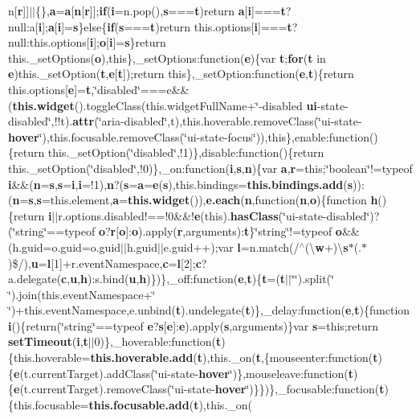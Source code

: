 {n}\mbox{[}{\bf r}\mbox{]}\mbox{]}$\vert$$\vert$\{\},{\bf a}={\bf a}\mbox{[}{\bf n}\mbox{[}{\bf r}\mbox{]}\mbox{]};{\bf if}({\bf i}=n.\-pop(),{\bf s}==={\bf t})return {\bf a}\mbox{[}{\bf i}\mbox{]}==={\bf t}?null\-:a\mbox{[}{\bf i}\mbox{]};{\bf a}\mbox{[}{\bf i}\mbox{]}={\bf s}\}else\{{\bf if}({\bf s}==={\bf t})return this.\-options\mbox{[}{\bf i}\mbox{]}==={\bf t}?null\-:this.\-options\mbox{[}{\bf i}\mbox{]};{\bf o}\mbox{[}{\bf i}\mbox{]}={\bf s}\}return this.\-\_\-set\-Options({\bf o}),this\},\-\_\-set\-Options\-:function({\bf e})\{var {\bf t};{\bf for}({\bf t} in {\bf e})this.\-\_\-set\-Option({\bf t},{\bf e}\mbox{[}{\bf t}\mbox{]});return this\},\-\_\-set\-Option\-:function({\bf e},{\bf t})\{return this.\-options\mbox{[}{\bf e}\mbox{]}={\bf t},\char`\"{}disabled\char`\"{}===e\&\&({\bf this.\-widget}().toggle\-Class(this.\-widget\-Full\-Name+\char`\"{}-\/disabled {\bf ui}-\/state-\/disabled\char`\"{},!!t).{\bf attr}(\char`\"{}aria-\/disabled\char`\"{},t),this.\-hoverable.\-remove\-Class(\char`\"{}ui-\/state-\/{\bf hover}\char`\"{}),this.\-focusable.\-remove\-Class(\char`\"{}ui-\/state-\/focus\char`\"{})),this\},enable\-:function()\{return this.\-\_\-set\-Option(\char`\"{}disabled\char`\"{},!1)\},disable\-:function()\{return this.\-\_\-set\-Option(\char`\"{}disabled\char`\"{},!0)\},\-\_\-on\-:function({\bf i},{\bf s},{\bf n})\{var {\bf a},{\bf r}=this;\char`\"{}boolean\char`\"{}!=typeof {\bf i}\&\&({\bf n}={\bf s},{\bf s}={\bf i},{\bf i}=!1),{\bf n}?({\bf s}={\bf a}={\bf e}({\bf s}),this.\-bindings={\bf this.\-bindings.\-add}({\bf s}))\-:({\bf n}={\bf s},{\bf s}=this.\-element,{\bf a}={\bf this.\-widget}()),{\bf e.\-each}({\bf n},function({\bf n},{\bf o})\{function {\bf h}()\{return {\bf i}$\vert$$\vert$r.\-options.\-disabled!==!0\&\&!{\bf e}(this).{\bf has\-Class}(\char`\"{}ui-\/state-\/disabled\char`\"{})?(\char`\"{}string\char`\"{}==typeof {\bf o}?{\bf r}\mbox{[}{\bf o}\mbox{]}\-:{\bf o}).apply({\bf r},arguments)\-:{\bf t}\}\char`\"{}string\char`\"{}!=typeof {\bf o}\&\&(h.\-guid=o.\-guid=o.\-guid$\vert$$\vert$h.\-guid$\vert$$\vert$e.\-guid++);var {\bf l}=n.\-match(/$^\wedge$(\textbackslash{}{\bf w}+)\textbackslash{}{\bf s}$\ast$(.$\ast$)\$/),{\bf u}={\bf l}\mbox{[}1\mbox{]}+r.\-event\-Namespace,{\bf c}={\bf l}\mbox{[}2\mbox{]};{\bf c}?a.\-delegate({\bf c},{\bf u},{\bf h})\-:s.\-bind({\bf u},{\bf h})\})\},\-\_\-off\-:function({\bf e},{\bf t})\{{\bf t}=({\bf t}$\vert$$\vert$\char`\"{}\char`\"{}).split(\char`\"{} \char`\"{}).join(this.\-event\-Namespace+\char`\"{} \char`\"{})+this.\-event\-Namespace,e.\-unbind({\bf t}).undelegate({\bf t})\},\-\_\-delay\-:function({\bf e},{\bf t})\{function {\bf i}()\{return(\char`\"{}string\char`\"{}==typeof {\bf e}?{\bf s}\mbox{[}{\bf e}\mbox{]}\-:{\bf e}).apply({\bf s},arguments)\}var {\bf s}=this;return {\bf set\-Timeout}({\bf i},{\bf t}$\vert$$\vert$0)\},\-\_\-hoverable\-:function({\bf t})\{this.\-hoverable={\bf this.\-hoverable.\-add}({\bf t}),this.\-\_\-on({\bf t},\{mouseenter\-:function({\bf t})\{{\bf e}(t.\-current\-Target).add\-Class(\char`\"{}ui-\/state-\/{\bf hover}\char`\"{})\},mouseleave\-:function({\bf t})\{{\bf e}(t.\-current\-Target).remove\-Class(\char`\"{}ui-\/state-\/{\bf hover}\char`\"{})\}\})\},\-\_\-focusable\-:function({\bf t})\{this.\-focusable={\bf this.\-focusable.\-add}({\bf t}),this.\-\_\-on({\bf }
